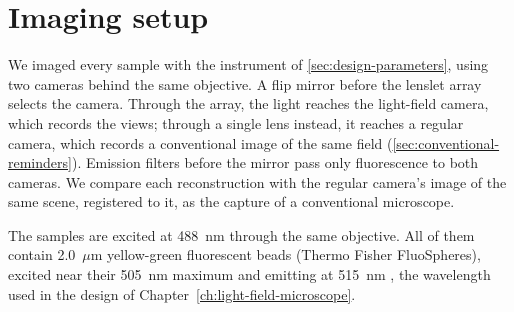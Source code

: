 \section{Imaging setup}
\label{sec:imaging-setup}

We imaged every sample with the instrument of \cref{sec:design-parameters}, using two cameras behind the same objective. A flip mirror before the lenslet array selects the camera. Through the array, the light reaches the light-field camera, which records the views; through a single lens instead, it reaches a regular camera, which records a conventional image of the same field (\cref{sec:conventional-reminders}). Emission filters before the mirror pass only fluorescence to both cameras. We compare each reconstruction with the regular camera's image of the same scene, registered to it, as the capture of a conventional microscope.

The samples are excited at 488~nm through the same objective. All of them contain 2.0~$\mu$m yellow-green fluorescent beads (Thermo Fisher FluoSpheres), excited near their 505~nm maximum and emitting at 515~nm \cite{thermofisher2026fluospheresYellowGreen}, the wavelength used in the design of Chapter~\ref{ch:light-field-microscope}.



